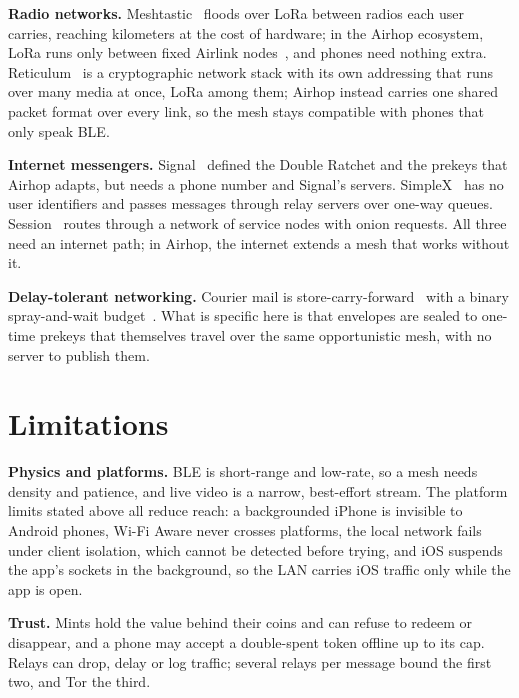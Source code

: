 \documentclass[conference]{IEEEtran}
\begin{document}
\textbf{Radio networks.} Meshtastic~\cite{meshtasticintro} floods over LoRa between radios each user carries, reaching kilometers at the cost of hardware; in the Airhop ecosystem, LoRa runs only between fixed Airlink nodes~\cite{airlinkwp}, and phones need nothing extra. Reticulum~\cite{reticulum} is a cryptographic network stack with its own addressing that runs over many media at once, LoRa among them; Airhop instead carries one shared packet format over every link, so the mesh stays compatible with phones that only speak BLE.

\textbf{Internet messengers.} Signal~\cite{doubleratchet,x3dh,pqxdh} defined the Double Ratchet and the prekeys that Airhop adapts, but needs a phone number and Signal's servers. SimpleX~\cite{simplex} has no user identifiers and passes messages through relay servers over one-way queues. Session~\cite{session2020} routes through a network of service nodes with onion requests. All three need an internet path; in Airhop, the internet extends a mesh that works without it.

\textbf{Delay-tolerant networking.} Courier mail is store-carry-forward~\cite{fall2003,rfc4838} with a binary spray-and-wait budget~\cite{spyropoulos2005}. What is specific here is that envelopes are sealed to one-time prekeys that themselves travel over the same opportunistic mesh, with no server to publish them.

\section{Limitations}
\label{sec:limits}

\textbf{Physics and platforms.} BLE is short-range and low-rate, so a mesh needs density and patience, and live video is a narrow, best-effort stream. The platform limits stated above all reduce reach: a backgrounded iPhone is invisible to Android phones, Wi-Fi Aware never crosses platforms, the local network fails under client isolation, which cannot be detected before trying, and iOS suspends the app's sockets in the background, so the LAN carries iOS traffic only while the app is open.

\textbf{Trust.} Mints hold the value behind their coins and can refuse to redeem or disappear, and a phone may accept a double-spent token offline up to its cap. Relays can drop, delay or log traffic; several relays per message bound the first two, and Tor the third.
\end{document}

